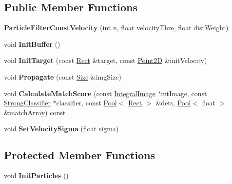 \subsection*{Public Member Functions}
\begin{DoxyCompactItemize}
\item 
\hypertarget{classParticleFilterConstVelocity_a0ae711261a1d992e08de13dac7e2ea70}{}{\bfseries Particle\+Filter\+Const\+Velocity} (int n, float velocity\+Thre, float dist\+Weight)\label{classParticleFilterConstVelocity_a0ae711261a1d992e08de13dac7e2ea70}

\item 
\hypertarget{classParticleFilterConstVelocity_a57692c0a571ab54262e2762469b10b00}{}void {\bfseries Init\+Buffer} ()\label{classParticleFilterConstVelocity_a57692c0a571ab54262e2762469b10b00}

\item 
\hypertarget{classParticleFilterConstVelocity_a3407d048b97f8caebe1353d53f831547}{}void {\bfseries Init\+Target} (const \hyperlink{classRect}{Rect} \&target, const \hyperlink{classPoint2D}{Point2\+D} \&init\+Velocity)\label{classParticleFilterConstVelocity_a3407d048b97f8caebe1353d53f831547}

\item 
\hypertarget{classParticleFilterConstVelocity_a72868ab78e4c4f49ce756e986839f993}{}void {\bfseries Propagate} (const \hyperlink{classSize}{Size} \&img\+Size)\label{classParticleFilterConstVelocity_a72868ab78e4c4f49ce756e986839f993}

\item 
\hypertarget{classParticleFilterConstVelocity_a46aae8bac98e7f6e1f13ad99ec8a38cd}{}void {\bfseries Calculate\+Match\+Score} (const \hyperlink{classIntegralImage}{Integral\+Image} $\ast$int\+Image, const \hyperlink{classStrongClassifier}{Strong\+Classifier} $\ast$classifier, const \hyperlink{classPool}{Pool}$<$ \hyperlink{classRect}{Rect} $>$ \&dets, \hyperlink{classPool}{Pool}$<$ float $>$ \&match\+Array) const \label{classParticleFilterConstVelocity_a46aae8bac98e7f6e1f13ad99ec8a38cd}

\item 
\hypertarget{classParticleFilterConstVelocity_a91f6d8afede8039cd3ed08acbcb67b47}{}void {\bfseries Set\+Velocity\+Sigma} (float sigma)\label{classParticleFilterConstVelocity_a91f6d8afede8039cd3ed08acbcb67b47}

\end{DoxyCompactItemize}
\subsection*{Protected Member Functions}
\begin{DoxyCompactItemize}
\item 
\hypertarget{classParticleFilterConstVelocity_a219193c3bdc2ed042c5473257227c3fb}{}void {\bfseries Init\+Particles} ()\label{classParticleFilterConstVelocity_a219193c3bdc2ed042c5473257227c3fb}

\end{DoxyCompactItemize}
